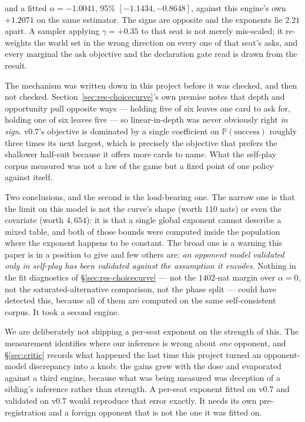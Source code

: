 \documentclass[11pt,a4paper]{article}
\newcommand{\Prob}{\ensuremath{\mathbb{P}}}
\begin{document}
\noindent and a fitted $\alpha = \mathbf{-1.0041}$, 95\%
$[-1.1434, -0.8648]$, against this engine's own $+1.2071$ on the same
estimator. The signs are opposite and the exponents lie $2.21$ apart. A
sampler applying $\gamma = +0.35$ to that seat is not merely mis-scaled; it
re-weights the world set in the wrong direction on every one of that seat's
asks, and every marginal the ask objective and the declaration gate read is
drawn from the result.

The mechanism was written down in this project before it was checked, and then
not checked. Section~\ref{sec:res-choicecurve}'s own premise notes that depth
and opportunity pull opposite ways --- holding five of six leaves one card to
ask for, holding one of six leaves five --- so linear-in-depth was never
obviously right \emph{in sign}. v0.7's objective is dominated by a single
coefficient on $\Prob(\text{success})$ roughly three times its next largest,
which is precisely the objective that prefers the shallower half-suit because
it offers more cards to name. What the self-play corpus measured was not a law
of the game but a fixed point of one policy against itself.

Two conclusions, and the second is the load-bearing one. The narrow one is
that the limit on this model is not the curve's shape (worth $110$ nats) or
even the covariate (worth $4{,}654$): it is that a single global exponent
cannot describe a mixed table, and both of those bounds were computed inside
the population where the exponent happens to be constant. The broad one is a
warning this paper is in a position to give and few others are: \emph{an
opponent model validated only in self-play has been validated against the
assumption it encodes}. Nothing in the fit diagnostics of
\S\ref{sec:res-choicecurve} --- not the $1402$-nat margin over $\alpha = 0$,
not the saturated-alternative comparison, not the phase split --- could have
detected this, because all of them are computed on the same self-consistent
corpus. It took a second engine.

We are deliberately not shipping a per-seat exponent on the strength of this.
The measurement identifies where our inference is wrong about \emph{one}
opponent, and \S\ref{sec:critic} records what happened the last time this
project turned an opponent-model discrepancy into a knob: the gains grew with
the dose and evaporated against a third engine, because what was being
measured was deception of a sibling's inference rather than strength. A
per-seat exponent fitted on v0.7 and validated on v0.7 would reproduce that
error exactly. It needs its own pre-registration and a foreign opponent that
is not the one it was fitted on.
\end{document}

